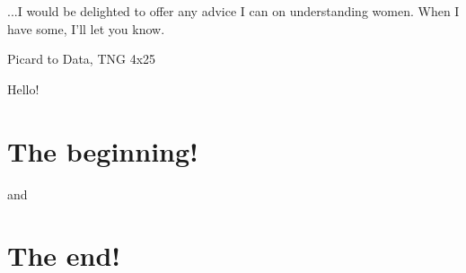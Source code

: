 \epigraph{...I would be delighted to offer any advice I can on understanding
women. When I have some, I'll let you know.}{Picard to Data, TNG 4x25}
Hello!
\section{The beginning!}
and
\section{The end!}
